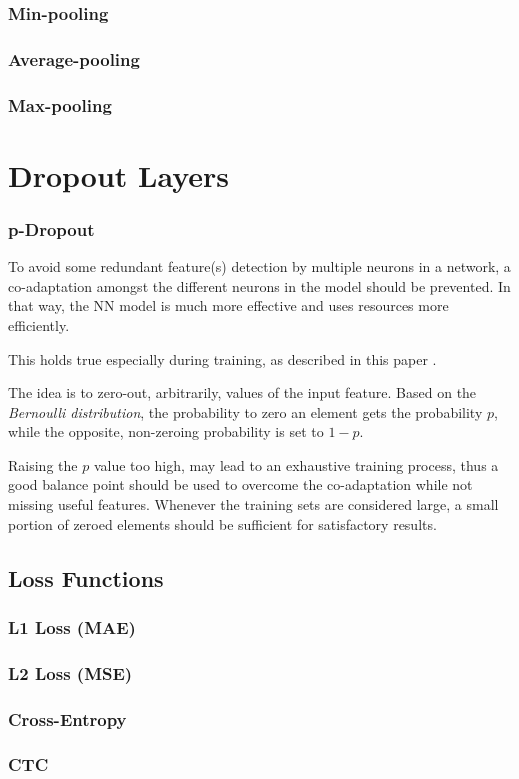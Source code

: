 \subsubsection{Min-pooling}
\subsubsection{Average-pooling}
\subsubsection{Max-pooling}

\section{Dropout Layers}
\subsubsection{p-Dropout}
To avoid some redundant feature(s) detection by multiple neurons in a network,
a co-adaptation amongst the different neurons in the model should be prevented. 
In that way, the NN model is much more effective and uses resources more efficiently.

This holds true especially during training, as described in this paper
\citep{hinton2012improving}.

The idea is to zero-out, arbitrarily, values of
the input feature. 
Based on the \emph{Bernoulli distribution}, the probability to zero an element gets the
probability \(p\), while the opposite, non-zeroing probability is set to \(1-p\). 

Raising the \(p\) value too high, may lead to an exhaustive training process, thus 
a good balance point should be used to overcome the co-adaptation while not missing 
useful features. Whenever the training sets are considered large, a small portion 
of zeroed elements should be sufficient for satisfactory results.  

\subsection{Loss Functions}
\subsubsection{L1 Loss (MAE)}
\subsubsection{L2 Loss (MSE)}
\subsubsection{Cross-Entropy}
\subsubsection{CTC}